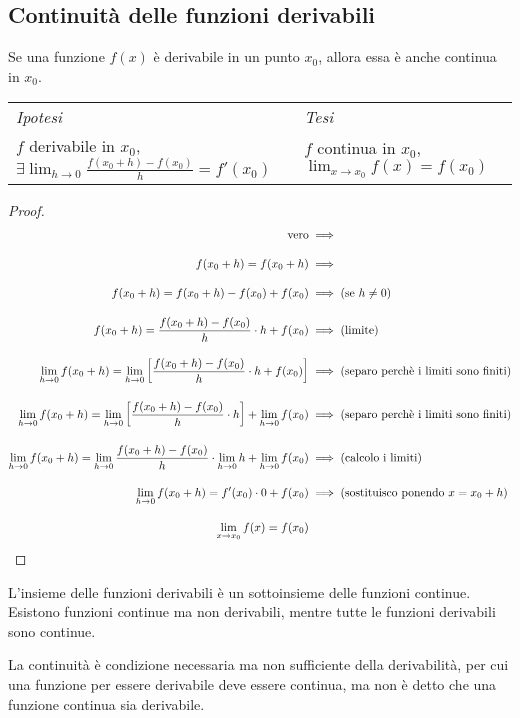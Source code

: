 \subsection{Continuità delle funzioni derivabili}
\begin{shadedTheorem}
    Se una funzione $f(x)$ è derivabile in un punto $x_0$, allora essa è anche continua in $x_0$.
\end{shadedTheorem}
\begin{tabular}{m{}m{}}
    \textit{Ipotesi} & \textit{Tesi}  \\
    $f$ derivabile in $x_0$, $\exists \lim_{h\to 0}\frac{f(x_0+h)-f(x_0)}{h}=f'(x_0)$ & $f$ continua in $x_0$, $\lim_{x\to x_0}f(x)=f(x_0)$ 
\end{tabular}
\begin{proof}
    \[  \begingroup
        \addtolength{\jot}{1em}
        \begin{aligned}
        \text{vero} & \implies\\
        f(x_0+h)=f(x_0+h) & \implies\\
        f(x_0+h)=f(x_0+h)-f(x_0)+f(x_0)& \implies (\text{se }h\neq 0)\\
        f(x_0+h)=\frac{f(x_0+h)-f(x_0)}{h}\cdot h+f(x_0)& \implies (\text{limite})\\
        \lim_{h\to0}f(x_0+h)=\lim_{h\to0}\left[\frac{f(x_0+h)-f(x_0)}{h}\cdot h+f(x_0)\right] &  \implies (\text{separo perchè i limiti sono finiti})\\
        \lim_{h\to0}f(x_0+h)=\lim_{h\to0}\left[\frac{f(x_0+h)-f(x_0)}{h}\cdot h\right]+\lim_{h\to0}f(x_0) &  \implies (\text{separo perchè i limiti sono finiti})\\
        \lim_{h\to0}f(x_0+h)=\lim_{h\to0}\frac{f(x_0+h)-f(x_0)}{h}\cdot \lim_{h\to0} h+\lim_{h\to0}f(x_0) &  \implies (\text{calcolo i limiti})\\
        \lim_{h\to0}f(x_0+h)=f'(x_0)\cdot 0+f(x_0) &  \implies (\text{sostituisco ponendo }x=x_0+h)\\
        \lim_{x\to x_0}f(x)=f(x_0) 
    \end{aligned}
    \endgroup
    \]
\end{proof}
\begin{oss}[1]
    L'insieme delle funzioni derivabili è un sottoinsieme delle funzioni continue. Esistono funzioni continue ma non derivabili, mentre tutte le funzioni derivabili sono continue.
\end{oss}
\begin{oss}[2]
    La continuità è condizione necessaria ma non sufficiente della derivabilità, per cui una funzione per essere derivabile deve essere continua, ma non è detto che una funzione continua sia derivabile.
\end{oss}
